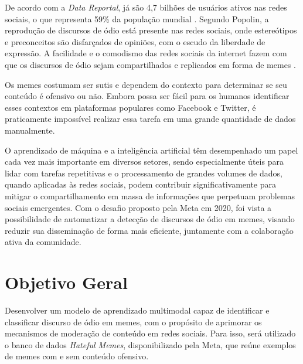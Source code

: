 
De acordo com a \textit{Data Reportal}, já são 4,7 bilhões de usuários ativos nas redes sociais, o que representa 59\% da população mundial \cite{DataReportal2022}. Segundo Popolin, a reprodução de discursos de ódio está presente nas redes sociais, onde estereótipos e preconceitos são disfarçados de opiniões, com o escudo da liberdade de expressão. A facilidade e o comodismo das redes sociais da internet fazem com que os discursos de ódio sejam compartilhados e replicados em forma de memes \cite{POPOLIN2018}.

Os memes costumam ser sutis e dependem do contexto para determinar se seu conteúdo é ofensivo ou não. Embora possa ser fácil para os humanos identificar esses contextos em plataformas populares como Facebook e Twitter, é praticamente impossível realizar essa tarefa em uma grande quantidade de dados manualmente. 

O aprendizado de máquina e a inteligência artificial têm desempenhado um papel cada vez mais importante em diversos setores, sendo especialmente úteis para lidar com tarefas repetitivas e o processamento de grandes volumes de dados, quando aplicadas às redes sociais, podem contribuir significativamente para mitigar o compartilhamento em massa de informações que perpetuam problemas sociais emergentes. Com o desafio proposto pela Meta em 2020, foi vista a possibilidade de automatizar a detecção de discursos de ódio em memes, visando reduzir sua disseminação de forma mais eficiente, juntamente com a colaboração ativa da comunidade.



\section{Objetivo Geral}

Desenvolver um modelo de aprendizado multimodal capaz de identificar e classificar discurso de ódio em memes, com o propósito de aprimorar os mecanismos de moderação de conteúdo em redes sociais. Para isso, será utilizado o banco de dados \textit{Hateful Memes}, disponibilizado pela Meta, que reúne exemplos de memes com e sem conteúdo ofensivo.

